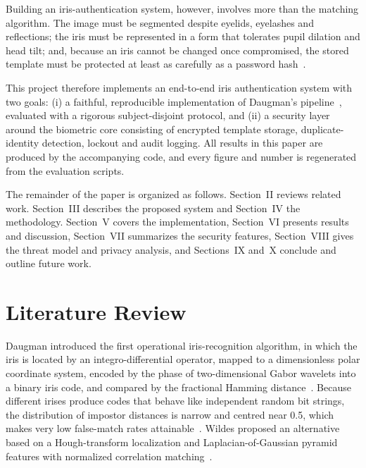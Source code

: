 \documentclass[conference]{IEEEtran}
\begin{document}
Building an iris-authentication system, however, involves more than the matching algorithm. The image must be segmented despite eyelids, eyelashes and reflections; the iris must be represented in a form that tolerates pupil dilation and head tilt; and, because an iris cannot be changed once compromised, the stored template must be protected at least as carefully as a password hash~\cite{ratha2001,jain2004}.

This project therefore implements an end-to-end iris authentication system with two goals: (i) a faithful, reproducible implementation of Daugman's pipeline~\cite{daugman2004}, evaluated with a rigorous subject-disjoint protocol, and (ii) a security layer around the biometric core consisting of encrypted template storage, duplicate-identity detection, lockout and audit logging. All results in this paper are produced by the accompanying code, and every figure and number is regenerated from the evaluation scripts.

The remainder of the paper is organized as follows. Section~II reviews related work. Section~III describes the proposed system and Section~IV the methodology. Section~V covers the implementation, Section~VI presents results and discussion, Section~VII summarizes the security features, Section~VIII gives the threat model and privacy analysis, and Sections~IX and~X conclude and outline future work.

\section{Literature Review}
Daugman introduced the first operational iris-recognition algorithm, in which the iris is located by an integro-differential operator, mapped to a dimensionless polar coordinate system, encoded by the phase of two-dimensional Gabor wavelets into a binary iris code, and compared by the fractional Hamming distance~\cite{daugman1993,daugman2004}. Because different irises produce codes that behave like independent random bit strings, the distribution of impostor distances is narrow and centred near 0.5, which makes very low false-match rates attainable~\cite{daugman2006}. Wildes proposed an alternative based on a Hough-transform localization and Laplacian-of-Gaussian pyramid features with normalized correlation matching~\cite{wildes1997}.
\end{document}
